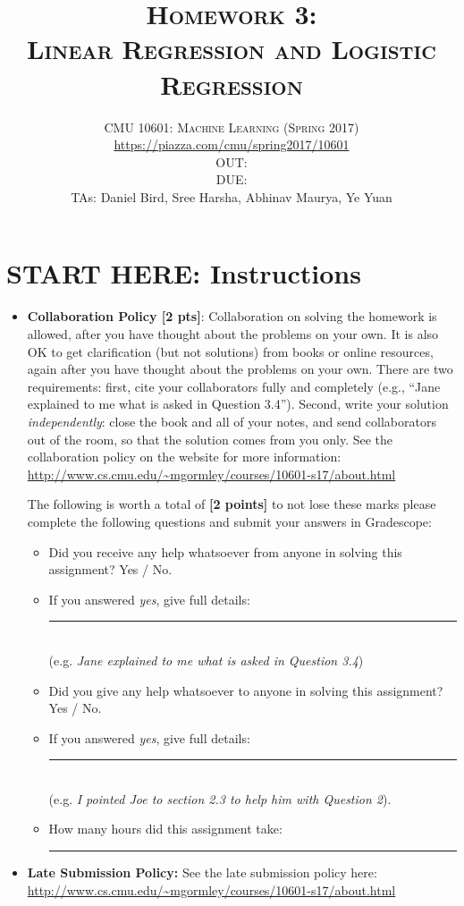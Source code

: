 \documentclass[a4paper]{article}
\title{\textsc{Homework 3: \\  Linear Regression and Logistic Regression}} %
\author{CMU 10601: \textsc{Machine Learning (Spring 2017)} \\
\url{https://piazza.com/cmu/spring2017/10601} \\
OUT: \outDate{} \\
DUE: \dueDate{} \\ 
TAs: Daniel Bird, Sree Harsha, Abhinav Maurya, Ye Yuan}
\date{}
\theoremstyle{definition}
\begin{document}
\maketitle 

\section*{START HERE: Instructions}
\begin{itemize}

\item \textbf{Collaboration Policy [2 pts]}: 
Collaboration on solving the homework is allowed, after you have thought about the problems on your own. It is also OK to get clarification (but not solutions) from books or online resources, again after you have thought about the problems on your own. There are two requirements: first, cite your collaborators fully and completely (e.g., ``Jane explained to me what is asked in Question 3.4''). Second, write your solution {\em independently}: close the book and all of your notes, and send collaborators out of the room, so that the solution comes from you only.  See the collaboration policy on the website for more information: \url{http://www.cs.cmu.edu/~mgormley/courses/10601-s17/about.html}

The following is worth a total of \textbf{[2 points]} to not lose these marks please complete the following questions and submit your answers in Gradescope:

\begin{itemize}
  \item Did you receive any help whatsoever from anyone in solving this assignment? Yes / No.
  \item If you answered \emph{yes}, give full details: \rule{0.5\textwidth}{.4pt} \\(e.g. \emph{Jane explained to me what is asked in Question 3.4})
  \item Did you give any help whatsoever to anyone in solving this assignment? Yes / No.
  \item If you answered \emph{yes}, give full details: \rule{0.5\textwidth}{.4pt} \\(e.g. \emph{I pointed Joe to section 2.3 to help him with Question 2}).
  \item How many hours did this assignment take: \rule{50\mm}{.4pt}
\end{itemize}

\item\textbf{Late Submission Policy:} See the late submission policy here: \url{http://www.cs.cmu.edu/~mgormley/courses/10601-s17/about.html}


\end{itemize}
\end{document}
